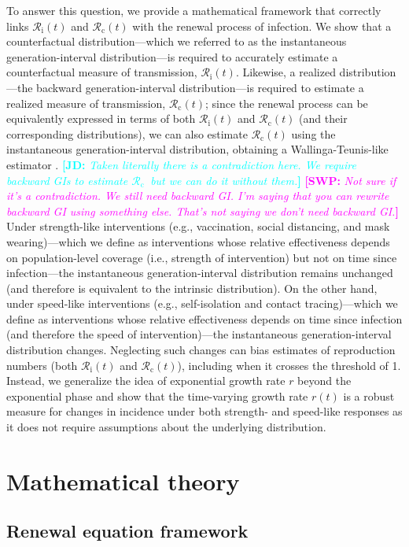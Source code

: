 \documentclass[12pt]{article}
\newcommand{\comment}{\showcomment}
\newcommand{\showcomment}[3]{\textcolor{#1}{\textbf{[#2: }\textsl{#3}\textbf{]}}}
\newcommand{\jd}[1]{\comment{cyan}{JD}{#1}}
\newcommand{\swp}[1]{\comment{magenta}{SWP}{#1}}
\newcommand{\Rx}[1]{\ensuremath{{\mathcal R}_{#1}}\xspace}
\newcommand{\Rc}{\Rx{\mathrm{c}}}
\newcommand{\Ri}{\Rx{\mathrm{i}}}
\begin{document}
To answer this question, we provide a mathematical framework that correctly links $\Ri(t)$ and $\Rc(t)$ with the renewal process of infection.
We show that a counterfactual distribution---which we referred to as the instantaneous generation-interval distribution---is required to accurately estimate a counterfactual measure of transmission, $\Ri(t)$.
Likewise, a realized distribution---the backward generation-interval distribution---is required to estimate a realized measure of transmission, $\Rc(t)$;
since the renewal process can be equivalently expressed in terms of both $\Ri(t)$ and $\Rc(t)$ (and their corresponding distributions), we can also estimate $\Rc(t)$ using the instantaneous generation-interval distribution, obtaining a Wallinga-Teunis-like estimator \citep{wallinga2004different}.
\jd{Taken literally there is a contradiction here. We require backward GIs to estimate \Rc\, but we can do it without them.}
\swp{Not sure if it's a contradiction. We still need backward GI. I'm saying that you can rewrite backward GI using something else. That's not saying we don't need backward GI.}
Under strength-like interventions (e.g., vaccination, social distancing, and mask wearing)---which we define as interventions whose relative effectiveness depends on population-level coverage (i.e., strength of intervention) but not on time since infection---the instantaneous generation-interval distribution remains unchanged (and therefore is equivalent to the intrinsic distribution).
On the other hand, under speed-like interventions (e.g., self-isolation and contact tracing)---which we define as interventions whose relative effectiveness depends on time since infection (and therefore the speed of intervention)---the instantaneous generation-interval distribution changes.
Neglecting such changes can bias estimates of reproduction numbers (both $\Ri(t)$ and $\Rc(t)$), including when it crosses the threshold of 1.
Instead, we generalize the idea of exponential growth rate $r$ beyond the exponential phase and show that the time-varying growth rate $r(t)$ is a robust measure for changes in incidence under both strength- and speed-like responses as it does not require assumptions about the underlying distribution.

\section{Mathematical theory}

\subsection{Renewal equation framework}
\end{document}

